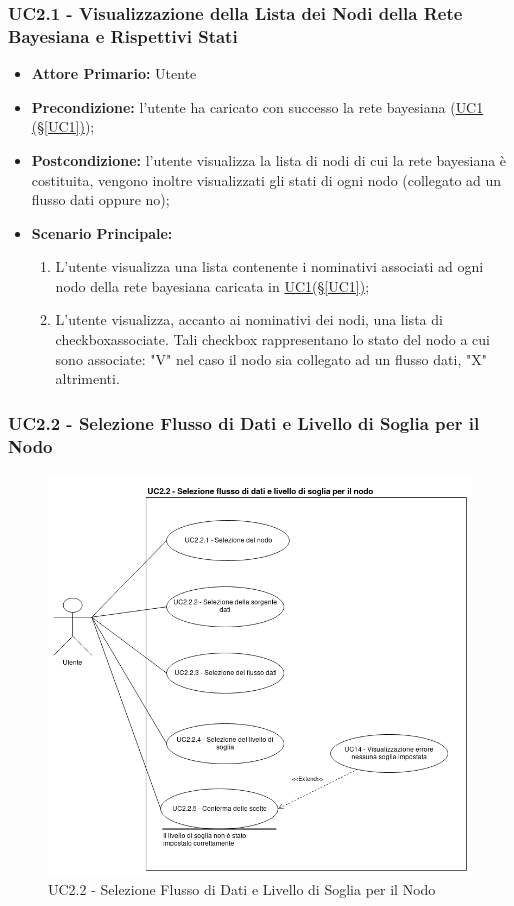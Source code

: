 \subsubsection{UC2.1 - Visualizzazione della Lista dei Nodi della Rete Bayesiana e Rispettivi Stati}\label{UC2.1}
\begin{itemize}
\item \textbf{Attore Primario:}  Utente
\item \textbf{Precondizione:} l'utente ha caricato con successo la rete bayesiana (\hyperref[UC1]{UC1 									(§\ref*{UC1})});
\item \textbf{Postcondizione:} l'utente visualizza la lista di nodi di cui la rete bayesiana è costituita, vengono 			inoltre visualizzati gli stati di ogni nodo (collegato ad un flusso dati oppure no);
\item \textbf{Scenario Principale:}
	\begin{enumerate}
	\item L'utente visualizza una lista contenente i nominativi associati ad ogni nodo della rete bayesiana caricata 				in \hyperref[UC1]{UC1(§\ref*{UC1})};
	\item L'utente visualizza, accanto ai nominativi dei nodi, una lista di checkbox\glossario associate. Tali checkbox 							rappresentano lo stato del nodo a cui sono associate: "V" nel caso il nodo sia collegato ad un flusso dati, "X" 		altrimenti.
	\end{enumerate}
\end{itemize}

\pagebreak

\subsubsection{UC2.2 - Selezione Flusso di Dati e Livello di Soglia per il Nodo}\label{UC2.2}

\begin{figure}[H]
\centering
\includegraphics[scale=0.5]{./images/UC2-2.png}
\caption{UC2.2 - Selezione Flusso di Dati e Livello di Soglia per il Nodo}
\end{figure}

